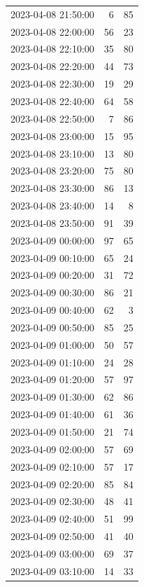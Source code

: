\documentclass[
  letterpaper,
  DIV=11,
  numbers=noendperiod]{scrartcl}
\begin{document}
\begin{tabular}{lrr}
2023-04-08 21:50:00 &     6 &    85 \\
2023-04-08 22:00:00 &    56 &    23 \\
2023-04-08 22:10:00 &    35 &    80 \\
2023-04-08 22:20:00 &    44 &    73 \\
2023-04-08 22:30:00 &    19 &    29 \\
2023-04-08 22:40:00 &    64 &    58 \\
2023-04-08 22:50:00 &     7 &    86 \\
2023-04-08 23:00:00 &    15 &    95 \\
2023-04-08 23:10:00 &    13 &    80 \\
2023-04-08 23:20:00 &    75 &    80 \\
2023-04-08 23:30:00 &    86 &    13 \\
2023-04-08 23:40:00 &    14 &     8 \\
2023-04-08 23:50:00 &    91 &    39 \\
2023-04-09 00:00:00 &    97 &    65 \\
2023-04-09 00:10:00 &    65 &    24 \\
2023-04-09 00:20:00 &    31 &    72 \\
2023-04-09 00:30:00 &    86 &    21 \\
2023-04-09 00:40:00 &    62 &     3 \\
2023-04-09 00:50:00 &    85 &    25 \\
2023-04-09 01:00:00 &    50 &    57 \\
2023-04-09 01:10:00 &    24 &    28 \\
2023-04-09 01:20:00 &    57 &    97 \\
2023-04-09 01:30:00 &    62 &    86 \\
2023-04-09 01:40:00 &    61 &    36 \\
2023-04-09 01:50:00 &    21 &    74 \\
2023-04-09 02:00:00 &    57 &    69 \\
2023-04-09 02:10:00 &    57 &    17 \\
2023-04-09 02:20:00 &    85 &    84 \\
2023-04-09 02:30:00 &    48 &    41 \\
2023-04-09 02:40:00 &    51 &    99 \\
2023-04-09 02:50:00 &    41 &    40 \\
2023-04-09 03:00:00 &    69 &    37 \\
2023-04-09 03:10:00 &    14 &    33 \\

\end{tabular}
\end{document}
